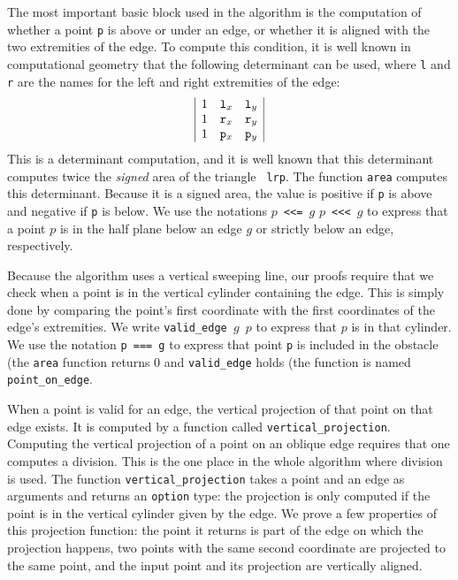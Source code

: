 \documentclass[a4paper, USenglish, cleveref, autoref, thm-restate]{lipics-v2021}
\begin{document}
The most important basic block used in the algorithm is the
computation of whether a point {\tt p} is above or under an edge, or whether
it is aligned with the two extremities of the edge.  To compute this
condition, it is well known in computational geometry \cite{Knuth} that the
following determinant can be used, where {\tt l} and {\tt r} are the
names for the left and right extremities of the edge:
\[\begin{array}{|ccc|}
1 & {\tt l}_x & {\tt l}_y\\
1 & {\tt r}_x & {\tt r}_y\\
1 & {\tt p}_x & {\tt p}_y\\
\end{array}\]
This is a determinant computation, and it is well known that this
determinant computes twice the {\em signed} area of the triangle {\tt
  lrp}.  The function {\tt area} computes this determinant.
Because it is a signed area, the value is positive if {\tt p}
is above and negative if {\tt p} is below.  We use the notations
{\tt \(p\) <{}<{}= \(g\)} {\tt \(p\) <{}<{}< \(g\)} to express that a point
\(p\) is in the half plane below an edge \(g\) or strictly below an
edge, respectively.

Because the algorithm uses a vertical sweeping line, our proofs
require that we check when a point is in the vertical cylinder
containing the edge.  This is simply done by comparing the point's
first coordinate with the first coordinates of the edge's extremities.
We write {\tt valid\_edge \(g\) \(p\)} to express that \(p\) is in
that cylinder.  We use the notation {\tt p === g} to express that
point {\tt p} is included in the obstacle (the {\tt area} function
returns 0 and {\tt valid\_edge} holds (the function is named
{\tt point\_on\_edge}.

When a point is valid for an edge, the vertical projection of that
point on that edge exists.  It is computed by a function called
{\tt vertical\_projection}.  Computing the vertical projection of a
point on an oblique edge requires that one computes a division.  This
is the one place in the whole algorithm where division is used.
The function {\tt vertical\_projection} takes a point and an edge as
arguments and returns an {\tt option} type:
the projection is only computed if the point is in the vertical
cylinder given by the edge.  We prove a few properties of this
projection function: the point it returns is part of the edge on which
the projection happens, two points with the same second coordinate are
projected to the same point, and the input point and its projection
are vertically aligned.
\end{document}
